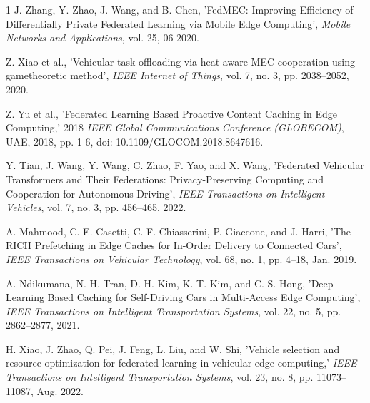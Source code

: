 \documentclass[journal]{IEEEtran}
\begin{document}
\begin{thebibliography}{1}
J. Zhang, Y. Zhao, J. Wang, and B. Chen, 'FedMEC: Improving Efficiency of Differentially Private Federated Learning via Mobile Edge Computing', \textit{Mobile Networks and Applications}, vol. 25, 06 2020.

Z. Xiao et al., 'Vehicular task offloading via heat-aware MEC cooperation using gametheoretic method', \textit{IEEE Internet of Things}, vol. 7, no. 3, pp. 2038–2052, 2020.

 Z. Yu et al., 'Federated Learning Based Proactive Content Caching in Edge Computing,' 2018 \textit{IEEE Global Communications Conference (GLOBECOM)}, UAE, 2018, pp. 1-6, doi: 10.1109/GLOCOM.2018.8647616.


Y. Tian, J. Wang, Y. Wang, C. Zhao, F. Yao, and X. Wang, 'Federated Vehicular Transformers and Their Federations: Privacy-Preserving Computing and Cooperation for Autonomous Driving', \textit{IEEE Transactions on Intelligent Vehicles}, vol. 7, no. 3, pp. 456–465, 2022.

A. Mahmood, C. E. Casetti, C. F. Chiasserini, P. Giaccone, and J. Harri, 'The RICH Prefetching in Edge Caches for In-Order Delivery to Connected Cars', \textit{IEEE Transactions on Vehicular Technology}, vol. 68, no. 1, pp. 4–18, Jan. 2019.


A. Ndikumana, N. H. Tran, D. H. Kim, K. T. Kim, and C. S. Hong, 'Deep Learning Based Caching for Self-Driving Cars in Multi-Access Edge Computing', \textit{IEEE Transactions on Intelligent Transportation Systems}, vol. 22, no. 5, pp. 2862–2877, 2021.

 H. Xiao, J. Zhao, Q. Pei, J. Feng, L. Liu, and W. Shi, 'Vehicle selection and resource optimization for federated learning in vehicular edge computing,' \textit{IEEE Transactions on Intelligent Transportation Systems}, vol. 23, no. 8, pp. 11073–11087, Aug. 2022. 





\end{thebibliography}
\end{document}
